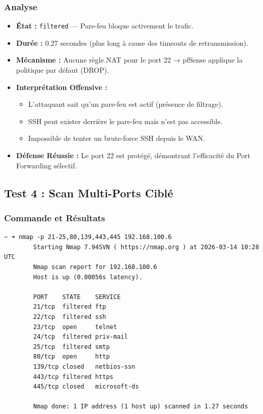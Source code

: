 \documentclass[12pt,a4paper,openany]{report}
\begin{document}
	
	\subsubsection{Analyse}
	\begin{itemize}
		\item \textbf{État :} \texttt{filtered} --- Pare-feu bloque activement le trafic.
		\item \textbf{Durée :} 0.27 secondes (plus long à cause des timeouts de retransmission).
		\item \textbf{Mécanisme :} Aucune règle NAT pour le port 22 → pfSense applique la politique par défaut (DROP).
		\item \textbf{Interprétation Offensive :}
		\begin{itemize}
			\item L'attaquant sait qu'un pare-feu est actif (présence de filtrage).
			\item SSH peut exister derrière le pare-feu mais n'est pas accessible.
			\item Impossible de tenter un brute-force SSH depuis le WAN.
		\end{itemize}
		\item \textbf{Défense Réussie :} Le port 22 est protégé, démontrant l'efficacité du Port Forwarding sélectif.
	\end{itemize}
	
	\subsection{Test 4 : Scan Multi-Ports Ciblé}
	\subsubsection{Commande et Résultats}
	\begin{lstlisting}[caption=Scan Nmap de ports multiples]
		~ ➜ nmap -p 21-25,80,139,443,445 192.168.100.6
		Starting Nmap 7.94SVN ( https://nmap.org ) at 2026-03-14 10:28 UTC
		Nmap scan report for 192.168.100.6
		Host is up (0.00056s latency).
		
		PORT    STATE    SERVICE
		21/tcp  filtered ftp
		22/tcp  filtered ssh
		23/tcp  open     telnet
		24/tcp  filtered priv-mail
		25/tcp  filtered smtp
		80/tcp  open     http
		139/tcp closed   netbios-ssn
		443/tcp filtered https
		445/tcp closed   microsoft-ds
		
		Nmap done: 1 IP address (1 host up) scanned in 1.27 seconds
	\end{lstlisting}
	
\end{document}
